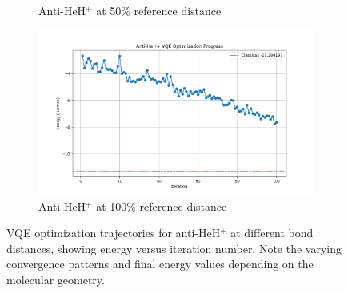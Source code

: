 \documentclass[10pt,twocolumn,a4paper]{article}
\begin{document}
\begin{figure}[t!]
\begin{subfigure}[b]{0.32\textwidth}
        \caption{Anti-HeH$^+$ at 50\% reference distance}
        \label{fig:vqe_progress_anti_50}
    \end{subfigure}
    \hfill
    \begin{subfigure}[b]{0.32\textwidth}
        \includegraphics[width=\textwidth]{graphs/vqe_progress_anti_heh+_100.png}
        \caption{Anti-HeH$^+$ at 100\% reference distance}
        \label{fig:vqe_progress_anti_100}
    \end{subfigure}
    \caption{VQE optimization trajectories for anti-HeH$^+$ at different bond distances, showing energy versus iteration number. Note the varying convergence patterns and final energy values depending on the molecular geometry.}
    \label{fig:vqe_progress_anti}
\end{figure}
\end{document}
